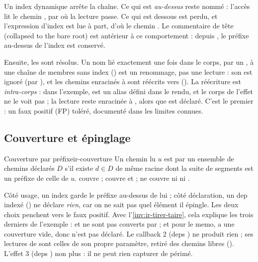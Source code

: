 Un index dynamique arrête la chaîne. Ce qui est \emph{au-dessus} reste nommé : l'accès  lit le chemin , par où la lecture passe. Ce qui est dessous est perdu, et l'expression d'index est lue à part, d'où le chemin . Le commentaire de tête (\og collapsed to the bare root\fg{}) est antérieur à ce comportement : depuis , le préfixe au-dessus de l'index est conservé.

Ensuite, les  sont résolus. Un nom lié exactement une fois dans le corps, par un , à une chaîne de membres sans index () est un renommage, pas une lecture : son  est ignoré (par ), et les chemins enracinés à  sont réécrits vers  (). La réécriture est \emph{intra-corps} : dans l'exemple,  est un alias défini dans le rendu, et le corps de l'effet ne le voit pas ; la lecture  reste enracinée à , alors que  est déclaré. C'est le premier \Warning{} : un faux positif (FP) toléré, documenté dans les limites connues.

\subsection{Couverture et épinglage}


\begin{definition}{Couverture par préfixe}{ir-couverture}
Un chemin lu $u$ est  par un ensemble de chemins déclarés $D$ s'il existe $d \in D$ de même racine dont la suite de segments est un préfixe de celle de $u$. \code{[x]} couvre  ; \code{[x.a]} couvre  et  ; \code{[x.b]} ne couvre ni  ni .
\end{definition}

Côté usage, un index garde le préfixe au-dessus de lui ; côté déclaration, un dep indexé (\code{[x[i]]}) ne déclare \emph{rien}, car on ne sait pas quel élément il épingle. Les deux choix penchent vers le faux positif. Avec l'\cref{inv:ir-tirer-taire}, cela explique les trois derniers \Warning{} de l'exemple :  et  ne sont pas couverts par  ; et pour le memo, \code{[...rows]} a une couverture vide, donc  n'est pas déclaré. Le callback 2 (deps ) ne produit rien ; ses lectures de  sont celles de son propre paramètre, retiré des chemins libres (). L'effet 3 (deps ) non plus : il ne peut rien capturer de périmé.

